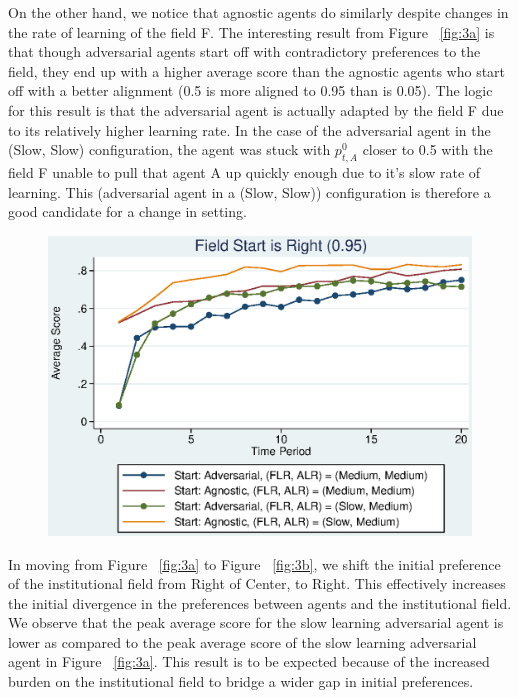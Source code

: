 \documentclass[12pt,letterpaper]{article}
\begin{document}
On the other hand, we notice that agnostic agents do similarly despite changes in the rate of learning of the field F. The interesting result from Figure ~\ref{fig:3a} is that though adversarial agents start off with contradictory preferences to the field, they end up with a higher average score than the agnostic agents who start off with a better alignment (0.5 is more aligned to 0.95 than is 0.05). The logic for this result is that the adversarial agent is actually adapted by the field F due to its relatively higher learning rate. In the case of the adversarial agent in the (Slow, Slow) configuration, the agent was stuck with $p_{t,A}^0$ closer to 0.5 with the field F unable to pull that agent A up quickly enough due to it's slow rate of learning. This (adversarial agent in a (Slow, Slow)) configuration is therefore a good candidate for a change in setting.



\begin{figure}[h]
\begin{centering}
  \caption{}
  \includegraphics[width=\textwidth]{frcmedium3c}
  \label{fig:3c}
\end{centering}
\end{figure}

In moving from Figure ~\ref{fig:3a} to Figure ~\ref{fig:3b}, we shift the initial preference of the institutional field from Right of Center, to Right. This effectively increases the initial divergence in the preferences between agents and the institutional field. We observe that the peak average score for the slow learning adversarial agent is lower as compared to the peak average score of the slow learning adversarial agent in Figure ~\ref{fig:3a}. This result is to be expected because of the increased burden on the institutional field to bridge a wider gap in initial preferences.
\end{document}
